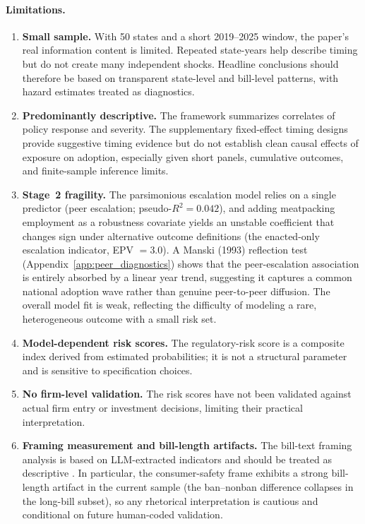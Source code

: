 \documentclass[12pt]{article}
\begin{document}
\paragraph{Limitations.}
\begin{enumerate}
    \item \textbf{Small sample.}  With 50 states and a short 2019--2025 window, the paper's real information content is limited.  Repeated state-years help describe timing but do not create many independent shocks.  Headline conclusions should therefore be based on transparent state-level and bill-level patterns, with hazard estimates treated as diagnostics.

    \item \textbf{Predominantly descriptive.}  The framework summarizes correlates of policy response and severity.  The supplementary fixed-effect timing designs provide suggestive timing evidence but do not establish clean causal effects of exposure on adoption, especially given short panels, cumulative outcomes, and finite-sample inference limits.

    \item \textbf{Stage~2 fragility.}  The parsimonious escalation model relies on a single predictor (peer escalation; pseudo-$R^2 = 0.042$), and adding meatpacking employment as a robustness covariate yields an unstable coefficient that changes sign under alternative outcome definitions (the enacted-only escalation indicator, EPV $= 3.0$).  A Manski (1993) reflection test (Appendix~\ref{app:peer_diagnostics}) shows that the peer-escalation association is entirely absorbed by a linear year trend, suggesting it captures a common national adoption wave rather than genuine peer-to-peer diffusion.  The overall model fit is weak, reflecting the difficulty of modeling a rare, heterogeneous outcome with a small risk set.

    \item \textbf{Model-dependent risk scores.}  The regulatory-risk score is a composite index derived from estimated probabilities; it is not a structural parameter and is sensitive to specification choices.

    \item \textbf{No firm-level validation.}  The risk scores have not been validated against actual firm entry or investment decisions, limiting their practical interpretation.

    \item \textbf{Framing measurement and bill-length artifacts.}  The bill-text framing analysis is based on LLM-extracted indicators and should be treated as descriptive \citep{grimmer2013text}.  In particular, the consumer-safety frame exhibits a strong bill-length artifact in the current sample (the ban--nonban difference collapses in the long-bill subset), so any rhetorical interpretation is cautious and conditional on future human-coded validation.


\end{enumerate}
\end{document}
